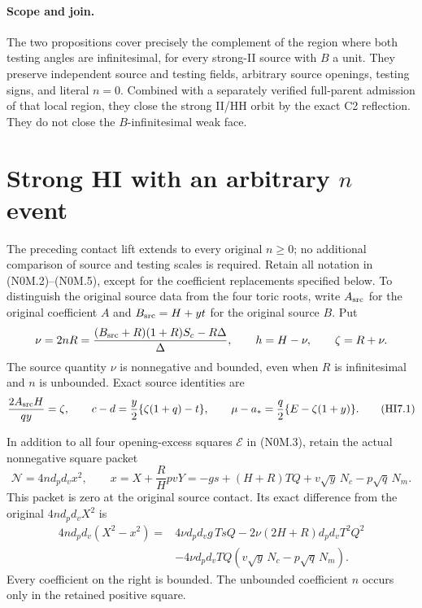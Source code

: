 \paragraph{Scope and join.}
The two propositions cover precisely the complement of the region
where both testing angles are infinitesimal, for every strong-II
source with $B$ a unit.  They preserve independent source and testing
fields, arbitrary source openings, testing signs, and literal $n=0$.
Combined with a separately verified full-parent admission of that
local region, they close the strong II/HH orbit by the exact C2
reflection.  They do not close the $B$-infinitesimal weak face.


\section{\texorpdfstring{Strong HI with an arbitrary $n$ event}{Strong HI with an arbitrary n event}}
\label{component:p4363feef60dd}

\label{p4363feef60dd:sec:r7-hi-full-retained}
The preceding contact lift extends to every original $n\geq0$; no
additional comparison of source and testing scales is required. Retain
all notation in (N0M.2)--(N0M.5), except for the coefficient replacements
specified below. To distinguish the original source data from the four
toric roots, write $A_{\rm src}$ for the original coefficient $A$ and
$B_{\rm src}=H+yt$ for the original source $B$. Put
\[
 \nu=2nR=\frac{(B_{\rm src}+R)(1+R)S_c-R\Delta}{\Delta},
 \qquad h=H-\nu,\qquad \zeta=R+\nu.
\]
The source quantity $\nu$ is nonnegative and bounded, even when $R$ is
infinitesimal and $n$ is unbounded. Exact source identities are
\[
 \frac{2A_{\rm src}H}{qy}=\zeta,\qquad
 c-d=\frac y2\{\zeta(1+q)-t\},\qquad
 \mu-a_*=\frac q2\{E-\zeta(1+y)\}.             \tag{HI7.1}
\]

In addition to all four opening-excess squares $\mathcal E$ in
(N0M.3), retain the actual nonnegative square packet
\[
 \mathcal N=4nd_pd_vx^2,\qquad
 x=X+\frac RHpvY
   =-g s+(H+R)TQ+v\sqrt y\,N_c-p\sqrt q\,N_m.
                                                               \tag{HI7.2}
\]
This packet is zero at the original source contact. Its exact difference
from the original $4nd_pd_vX^2$ is
\begin{align*}
 4nd_pd_v(X^2-x^2)={}&4\nu d_pd_vg\,TsQ
 -2\nu(2H+R)d_pd_vT^2Q^2\\
 &-4\nu d_pd_vTQ(v\sqrt y\,N_c-p\sqrt q\,N_m).
\end{align*}
Every coefficient on the right is bounded. The unbounded coefficient
$n$ occurs only in the retained positive square.

